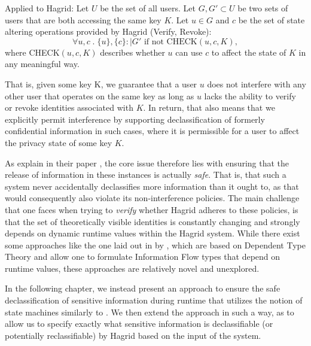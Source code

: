 Applied to Hagrid: Let \(U\) be the set of all users. Let \(G,G' \subset U\) be two sets of users that are both accessing the same key \(K\). Let \(u \in G\) and \(c\) be the set of state altering operations provided by Hagrid (Verify, Revoke): 
\[
    \forall u,c \;.\; \{u\}, \{c\} :\mid G' \text{ if not } \text{CHECK}(u,c,K),
\]
where CHECK\((u,c,K)\) describes whether \(u\) can use \(c\) to affect the state of \(K\) in any meaningful way.

That is, given some key K, we guarantee that a user \(u\) does not interfere with any other user that operates on the same key as long as \(u\) lacks the ability to verify or revoke identities associated with \(K\). 
In return, that also means that we explicitly permit interference by supporting declassification of formerly confidential information in such cases, where it is permissible for a user to affect the privacy state of some key \(K\).

As \citeauthor{declass_dim_prin} explain in their paper , the core issue therefore lies with ensuring that the release of information in these instances is actually \emph{safe}. That is, that such a system never accidentally declassifies more information than it ought to, as that would consequently also violate its non-interference policies.
The main challenge that one faces when trying to \emph{verify} whether Hagrid adheres to these policies, is that the set of theoretically visible identities is constantly changing and strongly depends on dynamic runtime values within the Hagrid system. 
While there exist some approaches like the one laid out in  by \citeauthor{Lourenco_Caires_15}, which are based on Dependent Type Theory and allow one to formulate Information Flow types that depend on runtime values, these approaches are relatively novel and unexplored.

In the following chapter, we instead present an approach to ensure the safe declassification of sensitive information during runtime that utilizes the notion of state machines similarly to \citeauthor{Goguen_Meseguer_82}. We then extend the approach in such a way, as to allow us to specify exactly what sensitive information is declassifiable (or potentially reclassifiable) by Hagrid based on the input of the system.

